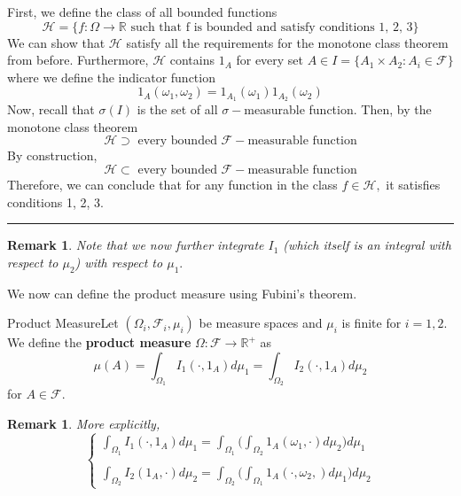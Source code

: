\documentclass[twoside]{article}
\newtheorem{remark}[theorem]{Remark}
\newenvironment{proof}{{\bf Proof:}}{\hfill\rule{2mm}{2mm}}
\newcommand{\sigmalgebra}{\mathcal{F}}
\newcommand{\positivereal}{\mathbb{R}^+}
\begin{document}
\begin{proof} First, we define the class of all bounded functions
$$\mathcal{H} = \{f: \Omega \rightarrow \mathbb{R} \text{ such that f is bounded and satisfy conditions 1, 2, 3}\}$$ We can show that $\mathcal{H}$ satisfy all the requirements for the monotone class theorem from before. Furthermore, $\mathcal{H}$ contains $1_A$ for every set $A \in I = \{A_1 \times A_2: A_i \in \sigmalgebra\}$ where we define the indicator function
$$
1_A(\omega_1, \omega_2) = 1_{A_{1}}(\omega_1)1_{A_{2}}(\omega_2)
$$
Now, recall that $\sigma(I)$ is the set of all $\sigma-$measurable function. Then, by the monotone class theorem
$$
\mathcal{H} \supset \text{ every bounded }\sigmalgebra-\text{measurable function}
$$
By construction, 
$$
\mathcal{H} \subset \text{ every bounded }\sigmalgebra-\text{measurable function}
$$
Therefore, we can conclude that for any function in the class $f \in \mathcal{H},$ it satisfies conditions 1, 2, 3.
\end{proof}
\begin{remark}Note that we now further integrate $I_1$ (which itself is an integral with respect to $\mu_2$) with respect to $\mu_1.$
\end{remark}

We now can define the product measure using Fubini's theorem.

\begin{definition_exam}{Product Measure}{}Let $(\Omega_i, \sigmalgebra_i, \mu_i)$ be measure spaces and $\mu_i$ is finite for $i = 1, 2$. We define the \textbf{product measure} $\Omega: \sigmalgebra \rightarrow \positivereal$ as 
$$
\mu(A) = \int_{\Omega_{1}}I_1(\cdot,1_A)d\mu_1 = \int_{\Omega_{2}}I_2(\cdot,1_A)d\mu_2
$$
for $A \in \sigmalgebra.$
\end{definition_exam}

\begin{remark}More explicitly, $$
\begin{cases}
\int_{\Omega_{1}}I_1(\cdot,1_A)d\mu_1 = \int_{\Omega_{1}} \bigg(\int_{\Omega_{2}}1_{A}(\omega_1, \cdot)d\mu_2 \bigg) d\mu_1\\\\
\int_{\Omega_{2}}I_2(1_A, \cdot)d\mu_2 = \int_{\Omega_{2}} \bigg(\int_{\Omega_{1}}1_{A}(\cdot,  \omega_2, )d\mu_1 \bigg) d\mu_2
\end{cases}
$$
\end{remark}
\end{document}
